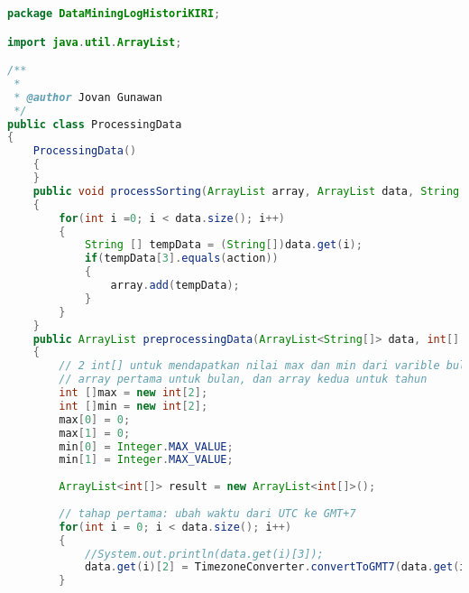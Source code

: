 \begin{lstlisting}[language=Java,basicstyle=\tiny,caption=ProcessingData.java]
package DataMiningLogHistoriKIRI;

import java.util.ArrayList;

/**
 *
 * @author Jovan Gunawan
 */
public class ProcessingData
{
    ProcessingData()
    {
    }
    public void processSorting(ArrayList array, ArrayList data, String action)
    {
        for(int i =0; i < data.size(); i++)
        {
            String [] tempData = (String[])data.get(i);
            if(tempData[3].equals(action))
            {
                array.add(tempData);
            }
        }
    }
    public ArrayList preprocessingData(ArrayList<String[]> data, int[] maxMin)
    {
        // 2 int[] untuk mendapatkan nilai max dan min dari varible bulan dan tahun yang digunakan untuk inisialisasi max min pada kelas SDForExtractData.
        // array pertama untuk bulan, dan array kedua untuk tahun
        int []max = new int[2];
        int []min = new int[2];
        max[0] = 0;
        max[1] = 0;
        min[0] = Integer.MAX_VALUE;
        min[1] = Integer.MAX_VALUE;
        
        ArrayList<int[]> result = new ArrayList<int[]>();
        
        // tahap pertama: ubah waktu dari UTC ke GMT+7
        for(int i = 0; i < data.size(); i++)
        {
            //System.out.println(data.get(i)[3]);
            data.get(i)[2] = TimezoneConverter.convertToGMT7(data.get(i)[2]);
        }
        

\end{lstlisting}
